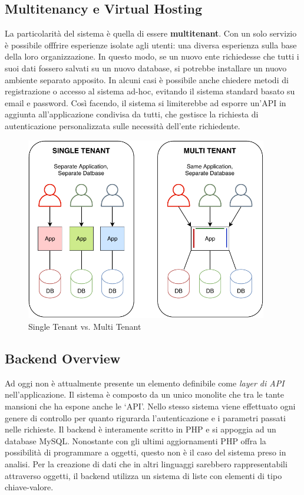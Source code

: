 \subsection{Multitenancy e Virtual Hosting}
La particolarità del sistema è quella di essere \textbf{multitenant}. Con un solo servizio è possibile offfrire esperienze isolate agli utenti: una diversa esperienza sulla base della loro organizzazione. In questo modo, se un nuovo ente richiedesse che tutti i suoi dati fossero salvati su un nuovo database, si potrebbe installare un nuovo ambiente separato apposito. In alcuni casi è possibile anche chiedere metodi di registrazione o accesso al sistema ad-hoc, evitando il sistema standard basato su email e password. Così facendo, il sistema si limiterebbe ad esporre un'API in aggiunta all'applicazione condivisa da tutti, che gestisce la richiesta di autenticazione personalizzata sulle necessità dell'ente richiedente.
\begin{figure}[H]
    \centering
    \includegraphics[width=0.94\textwidth]{images/02_3_multitenancy.pdf}
    \caption{Single Tenant vs. Multi Tenant}
    \label{fig:multitenancy}
\end{figure}

\subsection{Backend Overview}
Ad oggi non è attualmente presente un elemento definibile come \emph{layer di API} nell’applicazione. Il sistema è composto da un unico monolite che tra le tante mansioni che ha espone anche le `API'. Nello stesso sistema viene effettuato ogni genere di controllo per quanto rigurarda l'autenticazione e i parametri passati nelle richieste. Il backend è interamente scritto in PHP e si appoggia ad un database MySQL. Nonostante con gli ultimi aggiornamenti PHP offra la possibilità di programmare a oggetti, questo non è il caso del sistema preso in analisi. Per la creazione di dati che in altri linguaggi sarebbero rappresentabili attraverso oggetti, il backend utilizza un sistema di liste con elementi di tipo chiave-valore.

